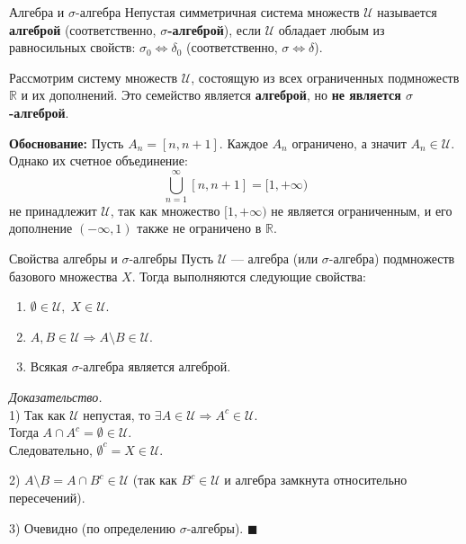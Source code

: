 \documentclass[12pt,a4paper]{article}
\newenvironment{Proof}[1][Доказательство]{\vspace{0.5em}\noindent\textit{#1.}\hspace{0.5em}\ignorespaces}{\hfill$\blacksquare$\vspace{1em}}
\begin{document}
\begin{Definition}{Алгебра и $\sigma$-алгебра}{}
Непустая симметричная система множеств $\mathcal{U}$ называется \textbf{алгеброй} (соответственно, \textbf{$\sigma$-алгеброй}), если $\mathcal{U}$ обладает любым из равносильных свойств: $\sigma_0 \Leftrightarrow \delta_0$ (соответственно, $\sigma \Leftrightarrow \delta$).
\end{Definition}

\begin{Example}[и контрпример]
Рассмотрим систему множеств $\mathcal{U}$, состоящую из всех ограниченных подмножеств $\mathbb{R}$ и их дополнений. Это семейство является \textbf{алгеброй}, но \textbf{не является $\sigma$-алгеброй}.

\textbf{Обоснование:} Пусть $A_n = [n, n+1]$. Каждое $A_n$ ограничено, а значит $A_n \in \mathcal{U}$. Однако их счетное объединение:
$$ \bigcup_{n=1}^{\infty} [n, n+1] = [1, +\infty) $$
не принадлежит $\mathcal{U}$, так как множество $[1, +\infty)$ не является ограниченным, и его дополнение $(-\infty, 1)$ также не ограничено в $\mathbb{R}$.
\end{Example}

\begin{Lemma}{Свойства алгебры и $\sigma$-алгебры}{}
Пусть $\mathcal{U}$ — алгебра (или $\sigma$-алгебра) подмножеств базового множества $X$. Тогда выполняются следующие свойства:
\begin{enumerate}
    \item $\emptyset \in \mathcal{U}, \; X \in \mathcal{U}$.
    \item $A, B \in \mathcal{U} \Rightarrow A \setminus B \in \mathcal{U}$.
    \item Всякая $\sigma$-алгебра является алгеброй.
\end{enumerate}
\end{Lemma}

\begin{Proof} \\
1) Так как $\mathcal{U}$ непустая, то $\exists A \in \mathcal{U} \Rightarrow A^c \in \mathcal{U}$. \\
Тогда $A \cap A^c = \emptyset \in \mathcal{U}$. \\
Следовательно, $\emptyset^c = X \in \mathcal{U}$.

2) $A \setminus B = A \cap B^c \in \mathcal{U}$ (так как $B^c \in \mathcal{U}$ и алгебра замкнута относительно пересечений).

3) Очевидно (по определению $\sigma$-алгебры).
\end{Proof}
\end{document}
